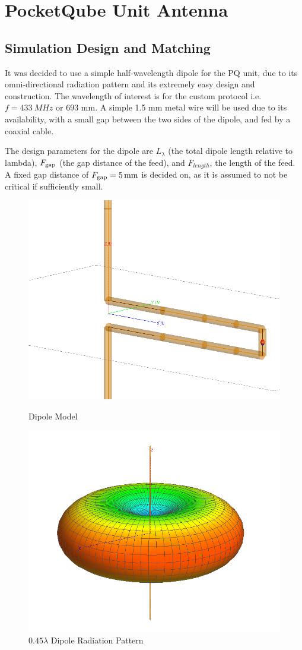 \graphicspath{{./figures}}

\section{PocketQube Unit Antenna}
\subsection{Simulation Design and Matching}
It was decided to use a simple half-wavelength dipole for the PQ unit, due to its omni-directional radiation pattern and its extremely easy design and construction. The wavelength of interest is for the custom protocol i.e. $f = \SI{433}{MHz}$ or 693 mm. A simple 1.5 mm metal wire will be used due to its availability, with a small gap between the two sides of the dipole, and fed by a coaxial cable.

The design parameters for the dipole are $L_\lambda$ (the total dipole length relative to lambda), $F_{\textnormal{gap}}$ (the gap distance of the feed), and $F_{length}$, the length of the feed. A fixed gap distance of $F_{\textnormal{gap}} = \SI{5}{mm}$ is decided on, as it is assumed to not be critical if sufficiently small.

\begin{figure}[!htb]
  \begin{minipage}{.49\textwidth}
    \centering
    \includegraphics[width=0.65\linewidth]{dipole1_modelMesh}
    \caption{Dipole Model}
    \label{fig:dipole1_modelMesh}
  \end{minipage}
  \begin{minipage}{.49\textwidth}
    \centering
    \includegraphics[width=0.65\linewidth]{dipole1_pattern_433MHz}
    \caption{$0.45 \lambda$ Dipole Radiation Pattern}
    \label{fig:dipole1_pattern_433MHz}
  \end{minipage}
\end{figure}

